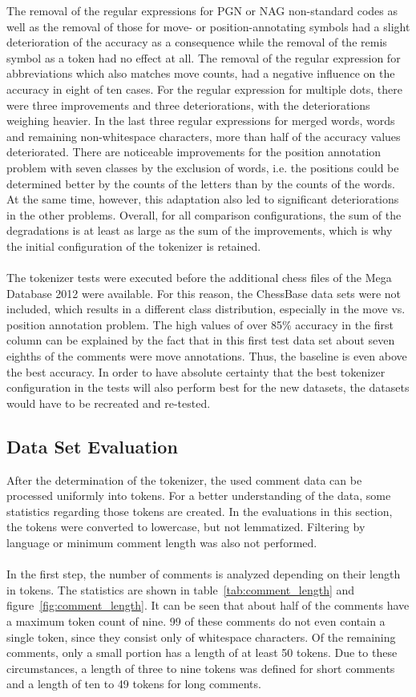 \documentclass[article,type=msc,colorback,accentcolor=tud7b]{tudthesis}
\begin{document}
    The removal of the regular expressions for PGN or NAG non-standard codes as well as the removal of those for move- or position-annotating symbols had a slight deterioration of the accuracy as a consequence while the removal of the remis symbol as a token had no effect at all. The removal of the regular expression for abbreviations which also matches move counts, had a negative influence on the accuracy in eight of ten cases. For the regular expression for multiple dots, there were three improvements and three deteriorations, with the deteriorations weighing heavier. In the last three regular expressions for merged words, words and remaining non-whitespace characters, more than half of the accuracy values deteriorated. There are noticeable improvements for the position annotation problem with seven classes by the exclusion of words, i.e. the positions could be determined better by the counts of the letters than by the counts of the words. At the same time, however, this adaptation also led to significant deteriorations in the other problems. Overall, for all comparison configurations, the sum of the degradations is at least as large as the sum of the improvements, which is why the initial configuration of the tokenizer is retained. \\\\
    The tokenizer tests were executed before the additional chess files of the Mega Database 2012 were available. For this reason, the ChessBase data sets were not included, which results in a different class distribution, especially in the move vs. position annotation problem. The high values of over 85\% accuracy in the first column can be explained by the fact that in this first test data set about seven eighths of the comments were move annotations. Thus, the baseline is even above the best accuracy. In order to have absolute certainty that the best tokenizer configuration in the tests will also perform best for the new datasets, the datasets would have to be recreated and re-tested.
 
  \subsection{Data Set Evaluation}    
    After the determination of the tokenizer, the used comment data can be processed uniformly into tokens. For a better understanding of the data, some statistics regarding those tokens are created. In the evaluations in this section, the tokens were converted to lowercase, but not lemmatized. Filtering by language or minimum comment length was also not performed. \\\\
    In the first step, the number of comments is analyzed depending on their length in tokens. The statistics are shown in table~\ref{tab:comment_length} and figure~\ref{fig:comment_length}. It can be seen that about half of the comments have a maximum token count of nine. 99 of these comments do not even contain a single token, since they consist only of whitespace characters. Of the remaining comments, only a small portion has a length of at least 50 tokens. Due to these circumstances, a length of three to nine tokens was defined for short comments and a length of ten to 49 tokens for long comments.
\end{document}

